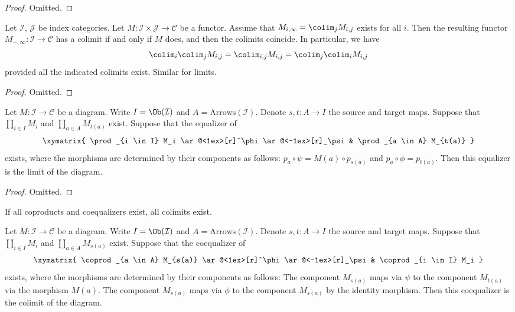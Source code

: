 \begin{proof}
Omitted.
\end{proof}


\begin{lemma}
\label{lemma-colimits-commute}
Let $\mathcal{I}$, $\mathcal{J}$ be index categories. Let
$M : \mathcal{I} \times \mathcal{J} \to \mathcal{C}$ be a functor.
Assume that $M_{i, \infty} = \colim_j M_{i,j}$ 
exists for all $i$. Then the resulting functor
$M_{-, \infty} : \mathcal{I} \to \mathcal{C}$
has a colimit if and only if $M$ does, and then the colimits coincide.
In particular, we have
$$
\colim_i \colim_j M_{i, j}
=
\colim_{i, j} M_{i, j}
=
\colim_j \colim_i M_{i, j}
$$
provided all the indicated colimits exist. Similar for limits.
\end{lemma}

\begin{proof}
Omitted.
\end{proof}

\begin{lemma}
\label{lemma-limits-products-equalizers}
Let $M : \mathcal{I} \to \mathcal{C}$ be a diagram.
Write $I = \Ob(\mathcal{I})$ and $A = \text{Arrows}(\mathcal{I})$.
Denote $s, t : A \to I$ the source and target maps.
Suppose that $\prod_{i \in I} M_i$ and $\prod_{a \in A} M_{t(a)}$
exist. Suppose that the equalizer of
$$
\xymatrix{
\prod_{i \in I} M_i
\ar@<1ex>[r]^\phi \ar@<-1ex>[r]_\psi
&
\prod_{a \in A} M_{t(a)}
}
$$
exists, where the morphisms are determined by their components
as follows: $p_a \circ \psi = M(a) \circ p_{s(a)}$
and $p_a \circ \phi = p_{t(a)}$. Then this equalizer is the
limit of the diagram.
\end{lemma}

\begin{proof}
Omitted.
\end{proof}


\begin{lemma}
\label{lemma-colimits-coproducts-coequalizers}
\begin{slogan}
If all coproducts and coequalizers exist, all colimits exist.
\end{slogan}
Let $M : \mathcal{I} \to \mathcal{C}$ be a diagram.
Write $I = \Ob(\mathcal{I})$ and $A = \text{Arrows}(\mathcal{I})$.
Denote $s, t : A \to I$ the source and target maps.
Suppose that $\coprod_{i \in I} M_i$ and $\coprod_{a \in A} M_{s(a)}$
exist. Suppose that the coequalizer of
$$
\xymatrix{
\coprod_{a \in A} M_{s(a)}
\ar@<1ex>[r]^\phi \ar@<-1ex>[r]_\psi
&
\coprod_{i \in I} M_i
}
$$
exists, where the morphisms are determined by their components
as follows: The component $M_{s(a)}$ maps via $\psi$
to the component $M_{t(a)}$ via the morphism $M(a)$.
The component $M_{s(a)}$ maps via $\phi$ to the component
$M_{s(a)}$ by the identity morphism. Then this coequalizer is the
colimit of the diagram.
\end{lemma}


